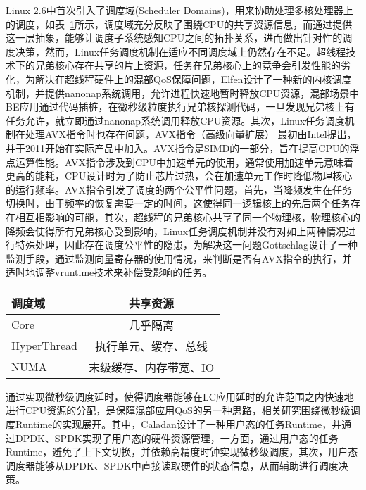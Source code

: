 Linux 2.6中首次引入了调度域(Scheduler Domains)\citep{schedulerdomains}，用来协助处理多核处理器上的调度，如表~\ref{tab:resourcesharing}所示，调度域充分反映了围绕CPU的共享资源信息，而通过提供这一层抽象，能够让调度子系统感知CPU之间的拓扑关系，进而做出针对性的调度决策，然而，Linux任务调度机制在适应不同调度域上仍然存在不足。超线程技术下的兄弟核心存在共享的片上资源，任务在兄弟核心上的竞争会引发性能的劣化，为解决在超线程硬件上的混部QoS保障问题，Elfen\citep{yang2016elfen}设计了一种新的内核调度机制，并提供nanonap系统调用，允许进程快速地暂时释放CPU资源，混部场景中BE应用通过代码插桩，在微秒级粒度执行兄弟核探测代码，一旦发现兄弟核上有任务允许，就立即通过nanonap系统调用释放CPU资源。其次，Linux任务调度机制在处理AVX指令时也存在问题，AVX指令（高级向量扩展）\citep{guide2011intel} 最初由Intel提出，并于2011开始在实际产品中加入。AVX指令是SIMD的一部分，旨在提高CPU的浮点运算性能。AVX指令涉及到CPU中加速单元的使用，通常使用加速单元意味着更高的能耗，CPU设计时为了防止芯片过热，会在加速单元工作时降低物理核心的运行频率。AVX指令引发了调度的两个公平性问题，首先，当降频发生在任务切换时，由于频率的恢复需要一定的时间，这使得同一逻辑核上的先后两个任务存在相互相影响的可能，其次，超线程的兄弟核心共享了同一个物理核，物理核心的降频会使得所有兄弟核心受到影响，Linux任务调度机制并没有对如上两种情况进行特殊处理，因此存在调度公平性的隐患，为解决这一问题Gottschlag\citep{gottschlag2020avx}设计了一种监测手段，通过监测向量寄存器的使用情况，来判断是否有AVX指令的执行，并适时地调整vruntime技术来补偿受影响的任务。

\begin{table}[!htbp]
    \label{tab:resourcesharing}
    \footnotesize%
    \setlength{\tabcolsep}{4pt}%
    \renewcommand{\arraystretch}{1.5}%
    \centering
    \begin{tabular}{lc}
        \hline
        调度域 & 共享资源\\
        \hline
        Core & 几乎隔离\\
        HyperThread & 执行单元、缓存、总线\\
        NUMA & 末级缓存、内存带宽、IO\\
        \hline
    \end{tabular}
\end{table}

通过实现微秒级调度延时，使得调度器能够在LC应用延时的允许范围之内快速地进行CPU资源的分配，是保障混部应用QoS的另一种思路\citep{ousterhout2019shenango,fried2020caladan,prekas2017zygos}，相关研究围绕微秒级调度Runtime的实现展开。其中，Caladan\citep{fried2020caladan}设计了一种用户态的任务Runtime，并通过DPDK、SPDK实现了用户态的硬件资源管理，一方面，通过用户态的任务Runtime，避免了上下文切换，并依赖高精度时钟实现微秒级调度，其次，用户态调度器能够从DPDK、SPDK中直接读取硬件的状态信息，从而辅助进行调度决策。

